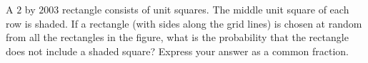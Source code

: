 A $2$ by $2003$ rectangle consists of unit squares. The middle unit square of each row is shaded. If a rectangle (with sides along the grid lines) is chosen at random from all the rectangles in the figure, what is the probability that the rectangle does not include a shaded square? Express your answer as a common fraction.
